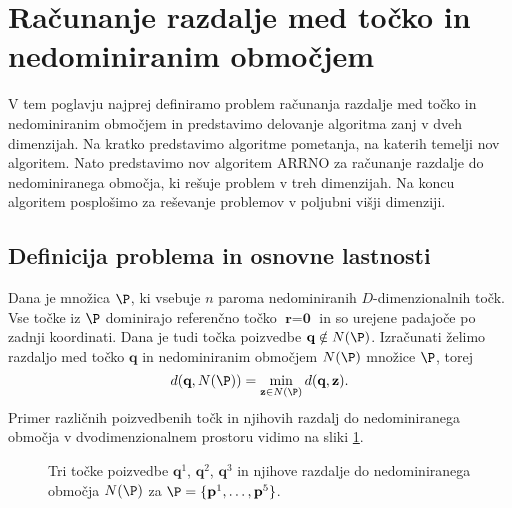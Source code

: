 \section{Računanje razdalje med točko in nedominiranim območjem}
\label{sec:resevanje}

V tem poglavju najprej definiramo problem računanja razdalje med točko in nedominiranim območjem in predstavimo delovanje algoritma zanj v dveh dimenzijah. Na kratko predstavimo algoritme pometanja, na katerih temelji nov algoritem. Nato predstavimo nov algoritem ARRNO za računanje razdalje do nedominiranega območja, ki rešuje problem v treh dimenzijah. Na koncu algoritem posplošimo za reševanje problemov v poljubni višji dimenziji. 


\subsection{Definicija problema in osnovne lastnosti}
Dana je množica $\P$, ki vsebuje $n$ paroma nedominiranih $D$-dimenzionalnih točk. Vse točke iz $\P$ dominirajo referenčno točko $\textbf{r} = \textbf{0}$ in so urejene padajoče po zadnji koordinati. Dana je tudi točka poizvedbe $\textbf{q} \notin N(\P)$. Izračunati želimo razdaljo med točko $\textbf{q}$ in nedominiranim območjem $N(\P)$ množice $\P$, torej
\[
d(\textbf{q}, N(\P)) = \min_{\textbf{z} \in N(\P)} d(\textbf{q}, \textbf{z}).
\]
Primer različnih poizvedbenih točk in njihovih razdalj do nedominiranega območja v dvodimenzionalnem prostoru vidimo na sliki \ref{fig:def_example}.
\begin{figure}[ht]
  \centering
  
  \caption{Tri točke poizvedbe $\textbf{q}^1$, $\textbf{q}^2$, $\textbf{q}^3$ in njihove razdalje do nedominiranega območja $N(\P)$ za $\P = \{ \textbf{p}^1, \dots, \textbf{p}^5\}$.}
  \label{fig:def_example}
\end{figure}

